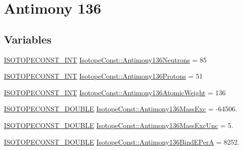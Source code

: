 \hypertarget{group___isotope_const-_antimony-_sb136}{}\section{Antimony 136}
\label{group___isotope_const-_antimony-_sb136}
\subsection*{Variables}
\begin{DoxyCompactItemize}
\item 
\mbox{\hyperlink{group___isotope_const-_macros_ga5f18360b3e99483a35c32d789e62621c}{I\+S\+O\+T\+O\+P\+E\+C\+O\+N\+S\+T\+\_\+\+I\+NT}} \mbox{\hyperlink{group___isotope_const-_antimony-_sb136_ga06b6cb5d721d81b6c0747cdd27aa5713}{Isotope\+Const\+::\+Antimony136\+Neutrons}} = 85
\item 
\mbox{\hyperlink{group___isotope_const-_macros_ga5f18360b3e99483a35c32d789e62621c}{I\+S\+O\+T\+O\+P\+E\+C\+O\+N\+S\+T\+\_\+\+I\+NT}} \mbox{\hyperlink{group___isotope_const-_antimony-_sb136_ga7e2d01a9c7a07191fd17c2b88f96b98c}{Isotope\+Const\+::\+Antimony136\+Protons}} = 51
\item 
\mbox{\hyperlink{group___isotope_const-_macros_ga5f18360b3e99483a35c32d789e62621c}{I\+S\+O\+T\+O\+P\+E\+C\+O\+N\+S\+T\+\_\+\+I\+NT}} \mbox{\hyperlink{group___isotope_const-_antimony-_sb136_ga4523e8831250f585dc2350383171b064}{Isotope\+Const\+::\+Antimony136\+Atomic\+Weight}} = 136
\item 
\mbox{\hyperlink{group___isotope_const-_macros_ga8f45a7272ce02c0b4c65c44636ed719a}{I\+S\+O\+T\+O\+P\+E\+C\+O\+N\+S\+T\+\_\+\+D\+O\+U\+B\+LE}} \mbox{\hyperlink{group___isotope_const-_antimony-_sb136_ga1ba719296ede0214ce89d87f7683073e}{Isotope\+Const\+::\+Antimony136\+Mass\+Exc}} = -\/64506.
\item 
\mbox{\hyperlink{group___isotope_const-_macros_ga8f45a7272ce02c0b4c65c44636ed719a}{I\+S\+O\+T\+O\+P\+E\+C\+O\+N\+S\+T\+\_\+\+D\+O\+U\+B\+LE}} \mbox{\hyperlink{group___isotope_const-_antimony-_sb136_ga9295acb3ba4e053ecd23d19d98db847e}{Isotope\+Const\+::\+Antimony136\+Mass\+Exc\+Unc}} = 5.
\item 
\mbox{\hyperlink{group___isotope_const-_macros_ga8f45a7272ce02c0b4c65c44636ed719a}{I\+S\+O\+T\+O\+P\+E\+C\+O\+N\+S\+T\+\_\+\+D\+O\+U\+B\+LE}} \mbox{\hyperlink{group___isotope_const-_antimony-_sb136_gaae8f900822e51af45382ef4fa738f702}{Isotope\+Const\+::\+Antimony136\+Bind\+E\+PerA}} = 8252.
\item 

\end{DoxyCompactItemize}
